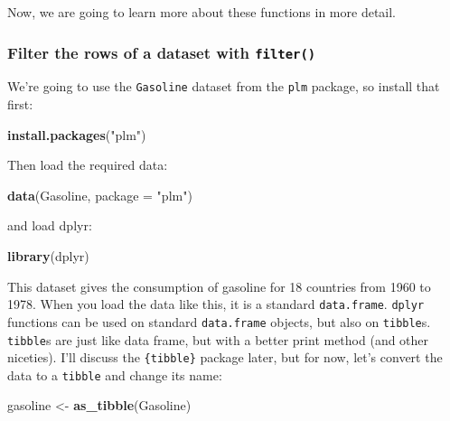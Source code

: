 \documentclass[]{gitbook}
\newenvironment{Shaded}{\begin{snugshade}}{\end{snugshade}}
\newcommand{\DataTypeTok}[1]{\textcolor[rgb]{0.13,0.29,0.53}{#1}}
\newcommand{\KeywordTok}[1]{\textcolor[rgb]{0.13,0.29,0.53}{\textbf{#1}}}
\newcommand{\NormalTok}[1]{#1}
\newcommand{\StringTok}[1]{\textcolor[rgb]{0.31,0.60,0.02}{#1}}
\begin{document}
Now, we are going to learn more about these functions in more detail.

\hypertarget{filter-the-rows-of-a-dataset-with-filter}{%
\subsubsection{\texorpdfstring{Filter the rows of a dataset with \texttt{filter()}}{Filter the rows of a dataset with filter()}}\label{filter-the-rows-of-a-dataset-with-filter}}

We're going to use the \texttt{Gasoline} dataset from the \texttt{plm} package, so install that first:

\begin{Shaded}
\begin{Highlighting}[]
\KeywordTok{install.packages}\NormalTok{(}\StringTok{"plm"}\NormalTok{)}
\end{Highlighting}
\end{Shaded}

Then load the required data:

\begin{Shaded}
\begin{Highlighting}[]
\KeywordTok{data}\NormalTok{(Gasoline, }\DataTypeTok{package =} \StringTok{"plm"}\NormalTok{)}
\end{Highlighting}
\end{Shaded}

and load dplyr:

\begin{Shaded}
\begin{Highlighting}[]
\KeywordTok{library}\NormalTok{(dplyr)}
\end{Highlighting}
\end{Shaded}

This dataset gives the consumption of gasoline for 18 countries from 1960 to 1978. When you load
the data like this, it is a standard \texttt{data.frame}. \texttt{dplyr} functions can be used on standard
\texttt{data.frame} objects, but also on \texttt{tibble}s. \texttt{tibble}s are just like data frame, but with a better
print method (and other niceties). I'll discuss the \texttt{\{tibble\}} package later, but for now, let's
convert the data to a \texttt{tibble} and change its name:

\begin{Shaded}
\begin{Highlighting}[]
\NormalTok{gasoline <-}\StringTok{ }\KeywordTok{as_tibble}\NormalTok{(Gasoline)}
\end{Highlighting}
\end{Shaded}
\end{document}
